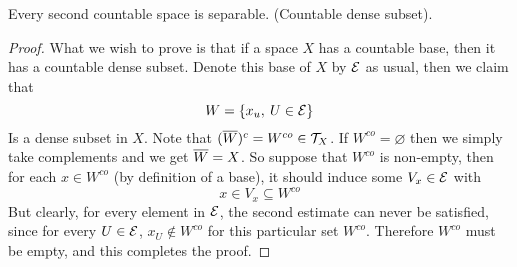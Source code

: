 \documentclass[../../main.tex]{subfiles}
\begin{document}
\begin{wts}
    Every second countable space is separable. (Countable dense subset).
\end{wts}
\begin{proof}
What we wish to prove is that if a space $X$ has a countable base, then it has a countable dense subset. Denote this base of $X$ by $\mathcal{E}$ as usual, then we claim that 
\[
W = \{x_u,\:U\in\mathcal{E}\}
\]
Is a dense subset in $X$. Note that $(\overline{W})^c= W^{co}\in\mathcal{T}_X$. If $W^{co}=\varnothing$ then we simply take complements and we get $\overline{W}=X$. So suppose that $W^{co}$ is non-empty, then for each $x\in W^{co}$ (by definition of a base), it should induce some $V_x\in\mathcal{E}$ with
\[
x\in V_x\subseteq W^{co}
\]
But clearly, for every element in $\mathcal{E}$, the second estimate can never be satisfied, since for every $U\in\mathcal{E}$, $x_U\notin W^{co}$ for this particular set $W^{co}$. Therefore $W^{co}$ must be empty, and this completes the proof.
\end{proof}
\end{document}
